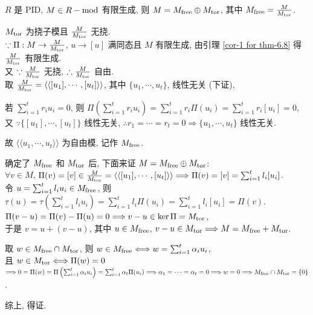 \documentclass{note}
\begin{document}
\begin{thm}[(课本定理 6.8)]\label{thm-6.8}
    $R$ 是 PID, $M\in R-\operatorname{mod}$ 有限生成, 则 $M=M_{\operatorname{free}}\oplus M_{\operatorname{tor}}$, 其中 $M_{\operatorname{free}}=\frac{M}{M_{\operatorname{tor}}}$.
\end{thm}
\begin{pf}
    $M_{\operatorname{tor}}$ 为挠子模且 $\frac{M}{M_{\operatorname{tor}}}$ 无挠.\\
    $\because\Pi:M\rightarrow\frac{M}{M_{\operatorname{tor}}}$, $u\rightarrow[u]$ 满同态且 $M$ 有限生成, 由引理 \ref{cor-1 for thm-6.8} 得 $\frac{M}{M_{\operatorname{tor}}}$ 有限生成.\\
    又 $\because\frac{M}{M_{\operatorname{tor}}}$ 无挠, $\therefore\frac{M}{M_{\operatorname{tor}}}$ 自由.\\
    取 $\frac{M}{M_{\operatorname{tor}}}=\langle\langle[u_1],\cdots,[u_t]\rangle\rangle$, 其中 $\{u_1,\cdots,u_t\}$, 线性无关 (下证),\\
    \begin{pf}
        若 $\sum_{i=1}^tr_iu_i=0$, 则 $\Pi\left(\sum_{i=1}^tr_iu_i\right)=\sum_{i=1}^tr_i\Pi(u_i)=\sum_{i=1}^tr_i[u_i]=0$,\\
        又 $\because\{[u_1],\cdots,[u_t]\}$ 线性无关, $\therefore r_1=\cdots=r_t=0\Longrightarrow\{u_1,\cdots,u_t\}$ 线性无关.
    \end{pf}
    故 $\langle\langle u_1,\cdots,u_t\rangle\rangle$ 为自由模, 记作 $M_{\operatorname{free}}$.

    确定了 $M_{\operatorname{free}}$ 和 $M_{\operatorname{tor}}$ 后, 下面来证 $M=M_{\operatorname{free}}\oplus M_{\operatorname{tor}}$:\\
    $\forall v\in M$, $\Pi(v)=[v]\in\frac{M}{M_{\operatorname{tor}}}=\langle\langle[u_1],\cdots,[u_t]\rangle\rangle\Longrightarrow\Pi(v)=[v]=\sum_{i=1}^tl_i[u_i]$.\\
    令 $u=\sum_{i=1}^tl_iu_i\in M_{\operatorname{free}}$, 则 $\tau(u)=\tau\left(\sum_{i=1}^tl_iu_i\right)=\sum_{i=1}^tl_i\Pi(u_i)=\sum_{i=1}^tl_i[u_i]=\Pi(v)$.\\
    $\Pi(v-u)=\Pi(v)-\Pi(u)=0\Longrightarrow v-u\in\ker\Pi=M_{\operatorname{tor}}$,\\
    于是 $v=u+(v-u)$, 其中 $u\in M_{\operatorname{free}}$, $v-u\in M_{\operatorname{tor}}\Longrightarrow M=M_{\operatorname{free}}+M_{\operatorname{tor}}$.

    取 $w\in M_{\operatorname{free}}\cap M_{\operatorname{tor}}$, 则 $w\in M_{\operatorname{free}}\Longleftrightarrow w=\sum_{i=1}^t\alpha_iu_i$,\\
    且 $w\in M_{\operatorname{tor}}\Longleftrightarrow\Pi(w)=0$\\
    $\Longrightarrow 0=\Pi(w)=\Pi\left(\sum_{i=1}^t\alpha_iu_i\right)=\sum_{i=1}^t\alpha_t\Pi(u_i)\Longrightarrow\alpha_1=\cdots=\alpha_t=0\Longrightarrow w=0\Longrightarrow M_{\operatorname{free}}\cap M_{\operatorname{tor}}=\{0\}$.

    综上, 得证.
\end{pf}
\end{document}
